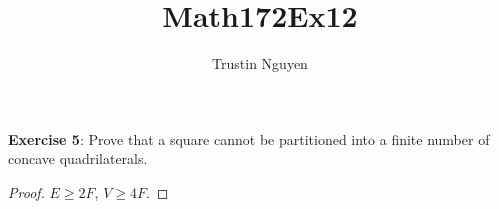 \documentclass{article}
\title{Math172Ex12}
\author{Trustin Nguyen}
\begin{document}
    \maketitle

\reversemarginpar

\textbf{Exercise 5}: Prove that a square cannot be partitioned into a finite number of concave quadrilaterals.
    \begin{proof}
        $E \geq 2F$, $V \geq 4F$.
    \end{proof}
\end{document}
